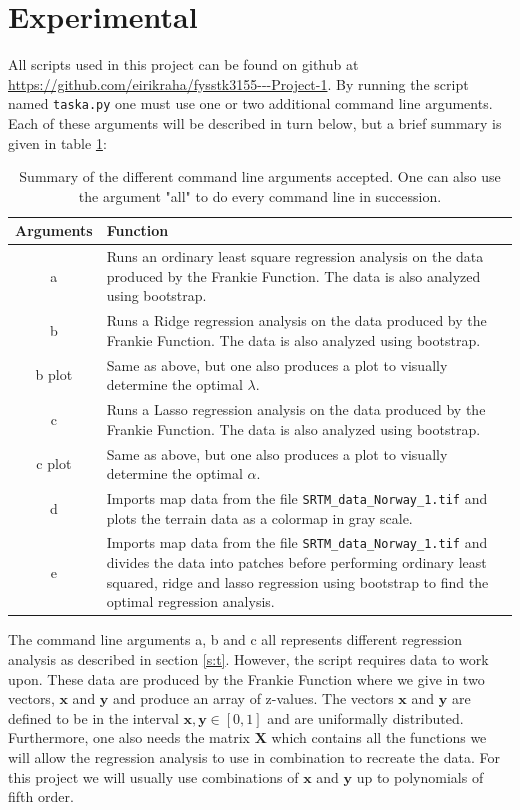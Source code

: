 \documentclass[12pt]{article}
\begin{document}
\section{Experimental}   \label{s:e}
All scripts used in this project can be found on github at \url{https://github.com/eirikraha/fysstk3155---Project-1}. By running the script named \texttt{taska.py} one must use one or two additional command line arguments. Each of these arguments will be described in turn below, but a brief summary is given in table \ref{tabE:sum}:
\begin{table}[H]
\centering
\begin{tabular}{c|p{12cm}}
\textbf{Arguments} & \textbf{Function} \\ \hline
a & Runs an ordinary least square regression analysis on the data produced by the Frankie Function. The data is also analyzed using bootstrap. \\ \hline
b & Runs a Ridge regression analysis on the data produced by the Frankie Function. The data is also analyzed using bootstrap. \\ \hline
b plot & Same as above, but one also produces a plot to visually determine the optimal $\lambda$. \\ \hline
c & Runs a Lasso regression analysis on the data produced by the Frankie Function. The data is also analyzed using bootstrap. \\ \hline
c plot & Same as above, but one also produces a plot to visually determine the optimal $\alpha$. \\ \hline
d & Imports map data from the file \texttt{SRTM\_data\_Norway\_1.tif} and plots the terrain data as a colormap in gray scale. \\ \hline
e & Imports map data from the file \texttt{SRTM\_data\_Norway\_1.tif} and divides the data into patches before performing ordinary least squared, ridge and lasso regression using bootstrap to find the optimal regression analysis.
\end{tabular}
\caption{Summary of the different command line arguments accepted. One can also use the argument "all" to do every command line in succession.}
\label{tabE:sum}
\end{table}
The command line arguments a, b and c all represents different regression analysis as described in section \ref{s:t}. However, the script requires data to work upon. These data are produced by the Frankie Function where we give in two vectors, $\bm{x}$ and $\bm{y}$ and produce an array of z-values. The vectors  $\bm{x}$ and $\bm{y}$ are defined to be in the interval $\bm{x}, \bm{y} \in [0,1]$ and are uniformally distributed. Furthermore, one also needs the matrix $\bm{X}$ which contains all the functions we will allow the regression analysis to use in combination to recreate the data. For this project we will usually use combinations of $\bm{x}$ and $\bm{y}$ up to polynomials of fifth order.
\end{document}

